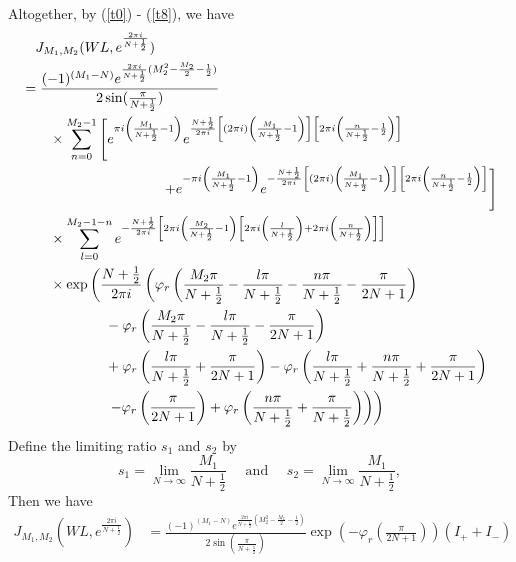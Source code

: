 \documentclass[10pt,a4paper]{article}
\newcommand{\lt}{\left}
\newcommand{\rt}{\right}
\begin{document}
Altogether, by (\ref{t0}) - (\ref{t8}), we have
\begin{align}
&\quad J_{M_1, M_2} (WL, e^{\frac{2\pi i}{N+\frac{1}{2}}}) \notag \\
&=  \frac{ (-1)^{(M_1 - N) }  e^{\frac{2\pi i}{N+\frac{1}{2}}(M_2^2 - \frac{M_2}{2} - \frac{1}{2})}}{2\sin(\frac{\pi}{N+\frac{1}{2}})} \notag \\
&\qquad \times \sum_{n=0}^{M_2-1} 
\lt[ e^{\pi i\lt(\frac{M_1}{N+\frac{1}{2}}-1\rt)}e^{\frac{N+\frac{1}{2}}{2\pi i}\lt[(2\pi i)\lt(\frac{M_1}{N+\frac{1}{2}} -1\rt)\rt] \lt[2\pi i \lt(\frac{n}{N+\frac{1}{2}}-\frac{1}{2}\rt)\rt]} \rt. \notag\\
&\qquad\qquad\qquad\qquad\qquad \lt. + e^{-\pi i\lt(\frac{M_1}{N+\frac{1}{2}}-1\rt)}e^{-\frac{N+\frac{1}{2}}{2\pi i}\lt[(2\pi i)\lt(\frac{M_1}{N+\frac{1}{2}} -1\rt)\rt] \lt[2\pi i \lt(\frac{n}{N+\frac{1}{2}}-\frac{1}{2}\rt)\rt]} \rt] \notag \\
&\qquad  \times \sum_{l=0}^{M_2-1-n}   e^{- \frac{N+\frac{1}{2}}{2\pi i} \lt[ 2\pi i \lt(\frac{M_2}{N+\frac{1}{2}} -1 \rt) \lt[ 2\pi i \lt(\frac{l}{N+\frac{1}{2}}\rt) + 2\pi i \lt( \frac{n}{N+\frac{1}{2}}\rt) \rt] \rt]} \notag\\ 
&\qquad \times \exp\lt(\frac{N+\frac{1}{2}}{2\pi i} \lt(\varphi_r \lt(\frac{M_2\pi}{N+\frac{1}{2}} - \frac{l\pi}{N+\frac{1}{2}} - \frac{n\pi}{N+\frac{1}{2}} - \frac{\pi}{2N+1}\rt)\rt. \rt. \notag\\
&\qquad\qquad\qquad  - \varphi_r\lt(\frac{M_2\pi}{N+\frac{1}{2}} - \frac{l\pi}{N+\frac{1}{2}} - \frac{\pi}{2N+1}\rt) \notag \\
&\qquad\qquad\qquad  + \varphi_r \lt(\frac{l\pi}{N+\frac{1}{2}} + \frac{\pi}{2N+1}\rt)  - \varphi_r\lt( \frac{l\pi}{N+\frac{1}{2}} + \frac{n\pi}{N+\frac{1}{2}} + \frac{\pi}{2N+1}\rt) \notag\\
&\lt.\lt.\qquad\qquad\qquad  - \varphi_r \lt(  \frac{\pi}{2N+1}\rt)  + \varphi_r\lt( \frac{n\pi}{N+\frac{1}{2}} + \frac{\pi}{N+\frac{1}{2}}\rt) \rt)\rt) 
\end{align}
Define the limiting ratio $s_1$ and $s_2$ by
$$ s_1 = \lim_{N \to \infty} \frac{M_1}{N+\frac{1}{2}} \quad\text{ and }\quad s_2 = \lim_{N \to \infty} \frac{M_1}{N+\frac{1}{2}},$$
Then we have
\begin{align}
J_{M_1, M_2} (WL, e^{\frac{2\pi i}{N+\frac{1}{2}}}) 
&=  \frac{ (-1)^{(M_1 - N) }  e^{\frac{2\pi i}{N+\frac{1}{2}}(M_2^2 - \frac{M_2}{2} - \frac{1}{2})}}{2\sin(\frac{\pi}{N+\frac{1}{2}})} \exp\lt(  -\varphi_r \lt(  \frac{\pi}{2N+1}\rt)\rt)
 (I_+ + I_-)
\end{align}
\end{document}
